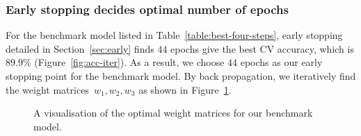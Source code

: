 \subsubsection{Early stopping decides optimal number of epochs}
For the benchmark model listed in Table~\ref{table:best-four-steps}, early stopping detailed in Section~\ref{sec:early} finds $44$ epochs give the best CV accuracy, which is $89.9\%$ (Figure~\ref{fig:acc-iter}). As a result, we choose $44$ epochs as our early stopping point for the benchmark model. By back propagation, we iteratively find the weight matrices~$w_1,w_2,w_3$ as shown in Figure~\ref{fig:weight}.
\begin{figure}
    \caption{\label{fig:weight} A visualisation of the optimal weight matrices for our benchmark model.}
\end{figure}
